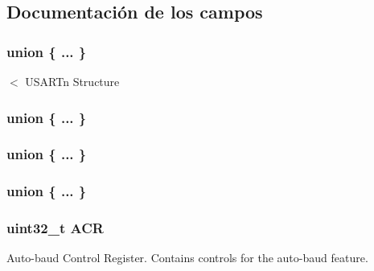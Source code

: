 \subsection{Documentación de los campos}
\subsubsection[{\texorpdfstring{"@64}{@64}}]{\setlength{\rightskip}{0pt plus 5cm}union \{ ... \} }\hypertarget{struct_l_p_c___u_s_a_r_t___t_a73702b79f9d345a92a61a2935dacb692}{}\label{struct_l_p_c___u_s_a_r_t___t_a73702b79f9d345a92a61a2935dacb692}
$<$ U\+S\+A\+R\+Tn Structure \subsubsection[{\texorpdfstring{"@66}{@66}}]{\setlength{\rightskip}{0pt plus 5cm}union \{ ... \} }\hypertarget{struct_l_p_c___u_s_a_r_t___t_a0f69f788943862e7c72c1079d58d30c9}{}\label{struct_l_p_c___u_s_a_r_t___t_a0f69f788943862e7c72c1079d58d30c9}
\subsubsection[{\texorpdfstring{"@68}{@68}}]{\setlength{\rightskip}{0pt plus 5cm}union \{ ... \} }\hypertarget{struct_l_p_c___u_s_a_r_t___t_a54e816fd157e5042a6b55edfcfb9f20b}{}\label{struct_l_p_c___u_s_a_r_t___t_a54e816fd157e5042a6b55edfcfb9f20b}
\subsubsection[{\texorpdfstring{"@70}{@70}}]{\setlength{\rightskip}{0pt plus 5cm}union \{ ... \} }\hypertarget{struct_l_p_c___u_s_a_r_t___t_ad64d51a198e401fea0c69431fcc0622d}{}\label{struct_l_p_c___u_s_a_r_t___t_ad64d51a198e401fea0c69431fcc0622d}
\subsubsection[{\texorpdfstring{A\+CR}{ACR}}]{ uint32\+\_\+t A\+CR}\hypertarget{struct_l_p_c___u_s_a_r_t___t_a9cb55206b29a8c16354747c556ab8bea}{}\label{struct_l_p_c___u_s_a_r_t___t_a9cb55206b29a8c16354747c556ab8bea}
Auto-\/baud Control Register. Contains controls for the auto-\/baud feature. 

